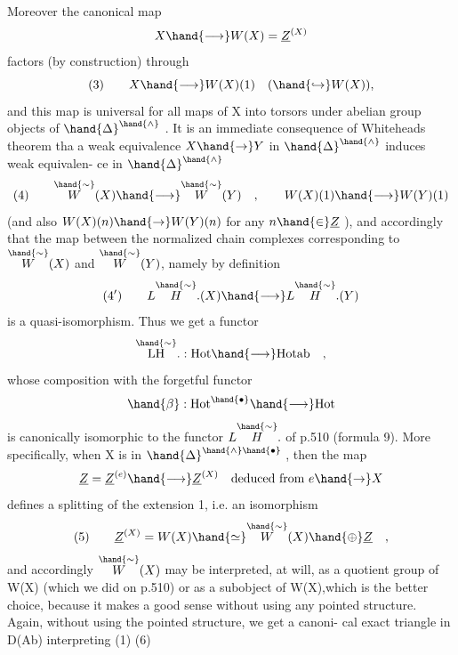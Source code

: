 
Moreover the canonical map
\[ X \hand{\longrightarrow} W(X) = \underline{Z}^{(X)} \]
factors (by construction) through
\[ (3) \qquad X \hand{\longrightarrow} W(X)(1) \quad ( \hand{\hookrightarrow} W(X) ) , \]
and this map is universal for all maps of X into torsors under abelian
group objects of $\hand{\Delta}^{\hand{\wedge}}$ . It is an immediate consequence of Whiteheads
theorem tha a weak equivalence $X \hand{\to} Y$ in $\hand{\Delta}^{\hand{\wedge}}$ induces  weak equivalen-%
ce in $\hand{\Delta}^{\hand{\wedge}}$
\[ (4) \qquad \overset{\hand{\sim}}{W}(X) \hand{\longrightarrow} \overset{\hand{\sim}}{W}(Y) \quad , \qquad W(X)(1) \hand{\longrightarrow} W(Y)(1) \]
(and also $W(X)(n) \hand{\to} W(Y)(n)$ for any $n \hand{\in} \underline{Z}$ ), and accordingly that
the map between the normalized chain complexes corresponding to $\overset{\hand{\sim}}{W}(X)$ and
$\overset{\hand{\sim}}{W}(Y)$, namely by definition
\[ (4') \qquad L\overset{\hand{\sim}}{H}.(X) \hand{\longrightarrow} L\overset{\hand{\sim}}{H}.(Y) \]
is a quasi-isomorphism. Thus we get  a functor
\[ \overset{\hand{\sim}}{\mathrm{LH}}. : \mathrm{Hot} \hand{\longrightarrow} \mathrm{Hotab} \quad , \]
whose composition with the forgetful functor
\[ \hand{\beta} : \mathrm{Hot}^{\hand{\bullet}} \hand{\longrightarrow} \mathrm{Hot} \]
is  canonically isomorphic to the functor $L\overset{\hand{\sim}}{H}.$ of p.510 (formula
9). More specifically, when X is in $\hand{\Delta}^{\hand{\wedge}\hand{\bullet}}$ , then the map
\[ \underline{Z} = \underline{Z}^{(e)} \hand{\longrightarrow} \underline{Z}^{(X)} \quad \text{deduced from } e \hand{\to} X \]
defines a splitting of the extension 1, i.e. an isomorphism
\[ (5) \qquad \underline{Z}^{(X)} = W(X) \hand{\simeq} \overset{\hand{\sim}}{W}(X) \hand{\oplus} \underline{Z} \quad , \]
and accordingly $\overset{\hand{\sim}}{W}(X)$ may be interpreted, at will, as a quotient group
of W(X) (which we did on p.510)\hand{,} or as a subobject of W(X),\deleted{(}which is the
better choice, because it makes a good sense without using any pointed
structure. Again, without using the pointed structure, we get a canoni-%
cal exact triangle in D(Ab) interpreting (1)
(6)

